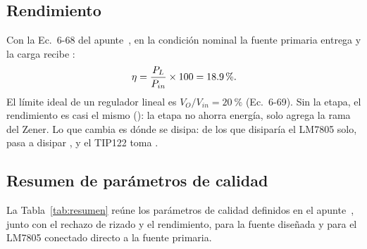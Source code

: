 \subsection{Rendimiento}
Con la Ec.~6-68 del apunte~\cite{ap2}, en la condición nominal la fuente primaria entrega  y la carga recibe :
\begin{equation}
    \eta = \frac{P_L}{P_{in}} \times 100 = \valu{1}{\simRendimiento}{\percent}.
\end{equation}
El límite ideal de un regulador lineal es $V_O/V_{in} = \SI{20}{\percent}$ (Ec.~6-69). Sin la etapa, el rendimiento es casi el mismo (): la etapa no ahorra energía, solo agrega la rama del Zener. Lo que cambia es dónde se disipa: de los  que disiparía el LM7805 solo, pasa a disipar , y el TIP122 toma .

\subsection{Resumen de parámetros de calidad}
La Tabla~\ref{tab:resumen} reúne los parámetros de calidad definidos en el apunte~\cite[Sec.~6-6-3]{ap2}, junto con el rechazo de rizado y el rendimiento, para la fuente diseñada y para el LM7805 conectado directo a la fuente primaria.

